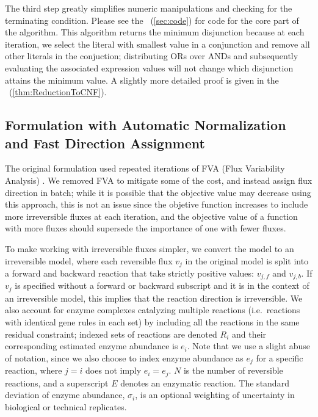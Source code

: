 The third step greatly simplifies numeric manipulations and checking
for the terminating condition. Please see the
\suppOrApp~(\ref{sec:code}) for code for the core part of the
algorithm. This algorithm returns the minimum disjunction because at
each iteration, we select the literal with smallest value in a
conjunction and remove all other literals in the conjuction;
distributing ORs over ANDs and subsequently evaluating the associated
expression values will not change which disjunction attains the
minimum value. A slightly more detailed proof is given in the
\suppOrApp~(\ref{thm:ReductionToCNF}).

\subsection{Formulation with Automatic Normalization and Fast Direction Assignment}

The original formulation used repeated iterations of FVA (Flux
Variability Analysis) \citep{Lee2012}. We removed FVA to mitigate some
of the cost, and instead assign flux direction in batch; while it is
possible that the objective value may decrease using this approach,
this is not an issue since the objetive function increases to include
more irreversible fluxes at each iteration, and the objective value of
a function with more fluxes should supersede the importance of one
with fewer fluxes.
 
To make working with irreversible fluxes simpler, we convert the model
to an irreversible model, where each reversible flux $v_j$ in the
original model is split into a forward and backward reaction that take
strictly positive values: $v_{j,f}$ and $v_{j,b}$. If $v_j$ is
specified without a forward or backward subscript and it is in the
context of an irreversible model, this implies that the reaction
direction is irreversible. We also account for enzyme complexes
catalyzing multiple reactions (i.e.\ reactions with identical gene
rules in each set) by including all the reactions in the same residual
constraint; indexed sets of reactions are denoted $R_i$ and their
corresponding estimated enzyme abundance is $e_i$. Note that we use a
slight abuse of notation, since we also choose to index enzyme
abundance as $e_j$ for a specific reaction, where $j = i$ does not
imply $e_i = e_j$. $N$ is the number of reversible reactions, and a
superscript $E$ denotes an enzymatic reaction. The standard deviation
of enzyme abundance, $\sigma_i$, is an optional weighting of
uncertainty in biological or technical replicates.

